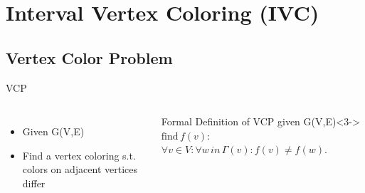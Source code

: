 \section{Interval Vertex Coloring (IVC)}
\subsection{Vertex Color Problem}
\begin{frame}{VCP}
  \begin{columns}
      \begin{itemize}
        \item<1-> Given G(V,E)
        \item<2-> Find a vertex coloring s.t. colors on adjacent vertices differ
      \end{itemize}
      \begin{block}{Formal Definition of VCP given G(V,E)}<3->
        $\text{find} \, f(v):$
        $\forall v\in V:\forall w \, in \, \Gamma(v): f(v) \neq f(w).$
      \end{block}
      
    \centering
    

\end{columns}
\end{frame}
